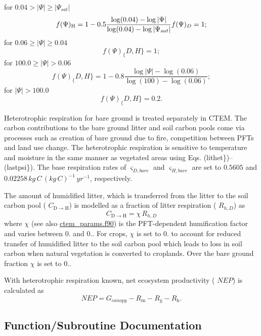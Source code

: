 for $0.04 > \vert\Psi\vert \geq \vert\Psi_{sat}\vert$ \[ f(\Psi)_\mathrm{H} = 1 - 0.5 \frac{\log(0.04)-\log\vert\Psi\vert} {\log(0.04)-\log\vert\Psi_{sat}\vert}\\ f(\Psi)_D = 1\nonumber; \] for $0.06 \geq \vert\Psi\vert \geq 0.04$ \[ f(\Psi)_\{D,H\} = 1; \] for $100.0 \geq \vert\Psi\vert > 0.06$ \[ f(\Psi)_\{D,H\} = 1 - 0.8\frac{\log\vert\Psi\vert-\log(0.06)}{\log(100)-\log(0.06)}; \] for $\vert\Psi\vert > 100.0$ \[ \label{lastpsi} f(\Psi)_\{D,H\}=0.2. \]

Heterotrophic respiration for bare ground is treated separately in C\+T\+E\+M. The carbon contributions to the bare ground litter and soil carbon pools come via processes such as creation of bare ground due to fire, competition between P\+F\+Ts and land use change. The heterotrophic respiration is sensitive to temperature and moisture in the same manner as vegetated areas using Eqs. (lithet\})--(lastpsi\}). The base respiration rates of $\varsigma_{D,bare}$ and $\varsigma_{H,bare}$ are set to $0.5605$ and $0.02258\,kg\,C\,(kg\,C)^{-1}\,yr^{-1}$, respectively.

The amount of humidified litter, which is transferred from the litter to the soil carbon pool ( $C_{\mathrm{D} \rightarrow \mathrm{H}}$) is modelled as a fraction of litter respiration ( $R_{h,D}$) as \[ \label{cdtoh} C_{\mathrm{D} \rightarrow \mathrm{H}} = \chi\,R_{h,D} \] where $\chi$ (see also \hyperlink{ctem__params_8f90}{ctem\+\_\+params.\+f90}) is the P\+F\+T-\/dependent humification factor and varies between 0. and 0.. For crops, $\chi$ is set to 0. to account for reduced transfer of humidified litter to the soil carbon pool which leads to loss in soil carbon when natural vegetation is converted to croplands. Over the bare ground fraction $\chi$ is set to 0..

With heterotrophic respiration known, net ecosystem productivity ( $NEP$) is calculated as \[ NEP = G_{canopy} - R_\mathrm{m} - R_\mathrm{g} - R_\mathrm{h}. \] 

\subsection{Function/\+Subroutine Documentation}
\hypertarget{group__hetresg_gaf35383e36392dff7ca33ff9022cb70c0}{}
